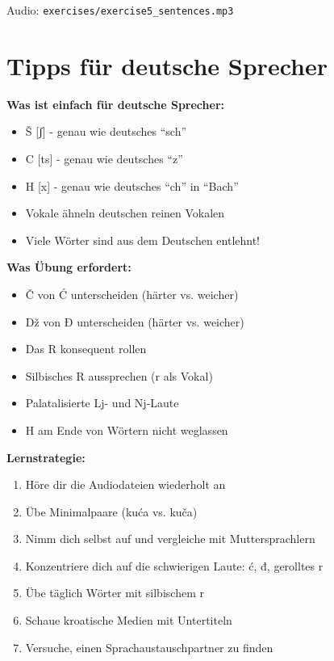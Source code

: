 Audio: \texttt{exercises/exercise5\_sentences.mp3}

\section{Tipps für deutsche Sprecher}

\begin{tcolorbox}[colback=lightblue!20, colframe=croatianblue, title=\textbf{Spezielle Tipps}]

\textbf{Was ist einfach für deutsche Sprecher:}
\begin{itemize}
    \item Š [ʃ] - genau wie deutsches ``sch''
    \item C [ts] - genau wie deutsches ``z''
    \item H [x] - genau wie deutsches ``ch'' in ``Bach''
    \item Vokale ähneln deutschen reinen Vokalen
    \item Viele Wörter sind aus dem Deutschen entlehnt!
\end{itemize}

\textbf{Was Übung erfordert:}
\begin{itemize}
    \item Č von Ć unterscheiden (härter vs. weicher)
    \item Dž von Đ unterscheiden (härter vs. weicher)
    \item Das R konsequent rollen
    \item Silbisches R aussprechen (r als Vokal)
    \item Palatalisierte Lj- und Nj-Laute
    \item H am Ende von Wörtern nicht weglassen
\end{itemize}

\textbf{Lernstrategie:}
\begin{enumerate}
    \item Höre dir die Audiodateien wiederholt an
    \item Übe Minimalpaare (kuća vs. kuča)
    \item Nimm dich selbst auf und vergleiche mit Muttersprachlern
    \item Konzentriere dich auf die schwierigen Laute: ć, đ, gerolltes r
    \item Übe täglich Wörter mit silbischem r
    \item Schaue kroatische Medien mit Untertiteln
    \item Versuche, einen Sprachaustauschpartner zu finden
\end{enumerate}

\end{tcolorbox}

